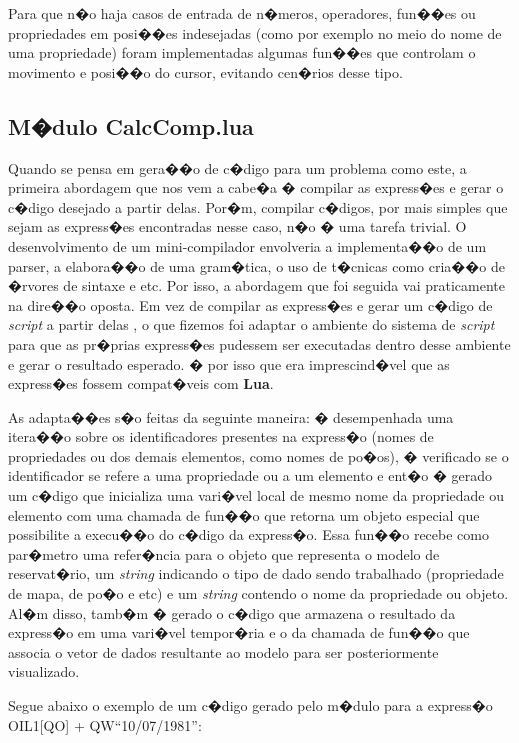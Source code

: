 \documentclass[dissertacao,modelo1,brazil]{ThesisPUC}
\newcommand{\script}{\emph{script}}
\begin{document}
Para que n�o haja casos de entrada de n�meros, operadores, fun��es ou propriedades em 
posi��es indesejadas (como por exemplo no meio do nome de uma propriedade) foram implementadas
algumas fun��es que controlam o movimento e posi��o do cursor, evitando cen�rios desse tipo.


\subsection{M�dulo CalcComp.lua}

Quando se pensa em gera��o de c�digo para um problema como este, a primeira abordagem que
nos vem a cabe�a � compilar  as express�es e gerar o c�digo desejado a partir delas.
Por�m, compilar c�digos, por mais simples que sejam as express�es
encontradas nesse caso, n�o � uma tarefa trivial. O desenvolvimento de um mini-compilador 
envolveria a implementa��o de um parser,
a elabora��o de uma gram�tica, o uso de t�cnicas como cria��o de �rvores de sintaxe
e etc. Por isso, a abordagem que foi seguida vai praticamente na dire��o oposta.
Em vez de compilar as express�es e gerar um c�digo de \script{} a partir delas
, o que fizemos foi adaptar o ambiente do sistema de \script{} 
para que as pr�prias express�es pudessem ser executadas dentro desse ambiente
e gerar o resultado esperado. � por isso que era imprescind�vel que as
express�es fossem compat�veis com \textbf{Lua}.

As adapta��es s�o feitas da seguinte maneira: � desempenhada uma itera��o sobre
os identificadores presentes na express�o (nomes de propriedades ou dos demais
elementos, como nomes de po�os), � verificado se o identificador se refere a uma propriedade
ou a um elemento e ent�o � gerado um c�digo que inicializa uma vari�vel local de mesmo
nome da propriedade ou elemento com uma chamada de fun��o que retorna um objeto
especial que possibilite a execu��o do c�digo da express�o. Essa fun��o recebe como par�metro
uma refer�ncia para o objeto que representa o modelo de reservat�rio, um \emph{string}
indicando o tipo de dado sendo trabalhado (propriedade de mapa, de po�o e etc) e um
\emph{string} contendo o nome da propriedade ou objeto. Al�m disso, tamb�m � gerado
o c�digo que armazena o resultado da express�o em uma vari�vel tempor�ria e
o da chamada de fun��o que associa o vetor de dados resultante ao modelo
para ser posteriormente visualizado.

Segue abaixo o exemplo de um c�digo gerado pelo m�dulo para a express�o OIL1[QO] + QW``10/07/1981'':
\end{document}
